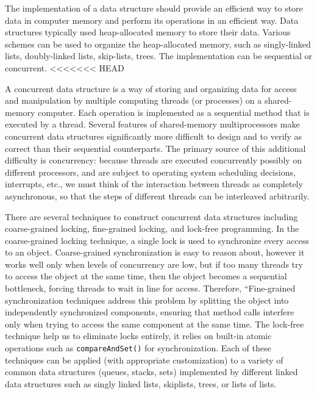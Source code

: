 The implementation of a data structure should provide
an efficient way to store data in computer memory and perform its operations
in an efficient way. Data structures
typically used heap-allocated memory to store their data. Various schemes
can be used to organize the heap-allocated memory, such as singly-linked lists,
doubly-linked lists, skip-lists, trees. The implementation
can be sequential or concurrent.
<<<<<<< HEAD

A concurrent data structure is a way of storing and organizing data for access and manipulation by multiple computing threads (or processes) on a shared-memory computer. Each operation is implemented as a sequential
method that is executed by a thread. Several features of shared-memory multiprocessors make concurrent data structures significantly more difficult to design and to verify as correct than their sequential counterparts. The primary source of this additional difficulty is concurrency: because threads are executed concurrently possibly on different processors, and are subject to operating system scheduling decisions, interrupts, etc., we must think of the interaction between threads as completely asynchronous, so that the steps of different threads can be interleaved arbitrarily. %



There are several techniques to construct concurrent data structures including coarse-grained locking, fine-grained locking, and lock-free programming. In the coarse-grained locking technique, a single lock is used to synchronize every access to an object. Coarse-grained synchronization is easy to reason about, however it works well only when levels of concurrency are low, but if too many threads try to access the object at the same time, then the object becomes a sequential bottleneck, forcing threads to wait in line for access. Therefore, “Fine-grained synchronization techniques address this problem by splitting the object into independently synchronized components, ensuring that method calls interfere only when trying to access the same component at the same time. 
The lock-free technique help us to eliminate locks entirely, it relies on built-in atomic operations such as {\tt compareAndSet()} for synchronization. Each of these techniques can be applied (with appropriate customization) to a variety of common data structures (queues, stacks, sets) implemented by different linked data structures such as singly linked lists, skiplists, trees, or lists of lists. 

